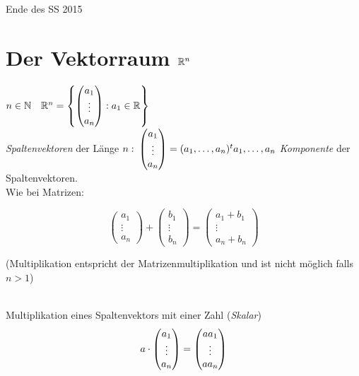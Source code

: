 

\resetHeadWidth
\newpage
\tableofcontents
\listoffigures
\clearpage
\setcounter{section}{-1}
\begin{center}
\Huge Ende des SS 2015
\end{center}
\section{Der Vektorraum $\mathbb{R}^n$}
$n \in \mathbb{N}\quad \mathbb{R}^n = \left\{ \begin{pmatrix}
a_1\\
\vdots\\
a_n
\end{pmatrix} : a_1 \in \mathbb{R} \right\}$\\
\emph{Spaltenvektoren} der Länge $n:\: \begin{pmatrix}
a_1\\\vdots\\a_n
\end{pmatrix} = (a_1,\ldots,a_n)^t\\
a_1,\ldots,a_n$ \emph{Komponente} der Spaltenvektoren.\\
Wie bei Matrizen:\\
\begin{minipage}{.5\textwidth}\[ \begin{pmatrix}
a_1\\\vdots\\a_n
\end{pmatrix}+ \begin{pmatrix}
b_1\\\vdots\\b_n
\end{pmatrix} = \begin{pmatrix}
a_1 + b_1\\\vdots\\a_n + b_n
\end{pmatrix}\]
\end{minipage}%
\begin{minipage}{.5\textwidth}
(Multiplikation entspricht der Matrizenmultiplikation und ist nicht möglich falls $n > 1$)
\end{minipage}\\
Multiplikation eines Spaltenvektors mit einer Zahl (\emph{Skalar})
\[ a \cdot \begin{pmatrix}
a_1\\\vdots\\a_n
\end{pmatrix} = \begin{pmatrix}
aa_1\\\vdots\\aa_n
\end{pmatrix} \]
